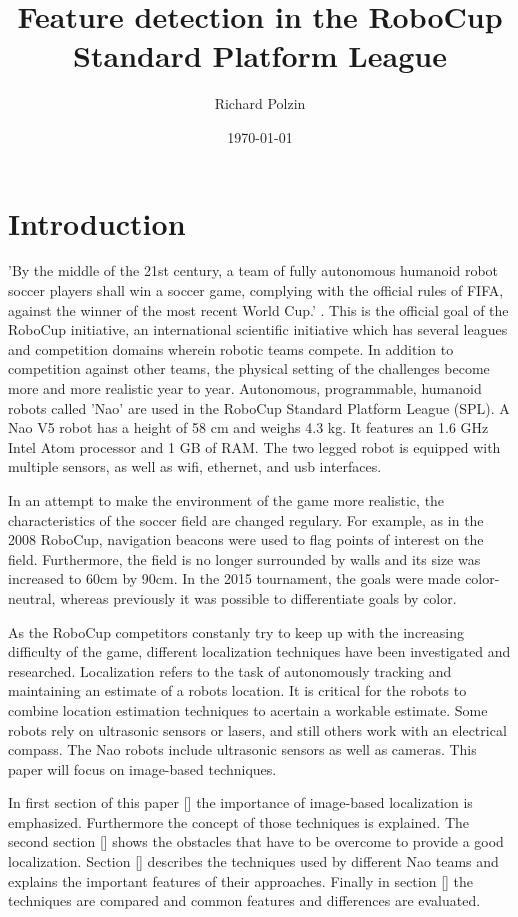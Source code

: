 \documentclass[12pt, a4paper]{apa6}
\author{Richard Polzin}
\title{Feature detection in the RoboCup Standard Platform League}
\date{\today}
\affiliation{}
\begin{document}
  \maketitle

  \section{Introduction}
  'By the middle of the 21st century, a team of fully autonomous humanoid robot soccer players shall win a soccer game, complying with the official rules of FIFA, against the winner of the most recent World Cup.' \cite{Kitano95robocup:the}. This is the official goal of the RoboCup initiative, an international scientific initiative which has several leagues and competition domains wherein robotic teams compete. In addition to competition against other teams, the physical setting of the challenges become more and more realistic year to year. Autonomous, programmable, humanoid robots called 'Nao' are used in the RoboCup Standard Platform League (SPL). A Nao V5 robot has a height of 58 cm and weighs 4.3 kg. It features an 1.6 GHz Intel Atom processor and 1 GB of RAM. The two legged robot is equipped with multiple sensors, as well as wifi, ethernet, and usb interfaces.

  In an attempt to make the environment of the game more realistic, the characteristics of the soccer field are changed regulary. For example, as in the 2008 RoboCup, navigation beacons were used to flag points of interest on the field. Furthermore, the field is no longer surrounded by walls and its size was increased to 60cm by 90cm. In the 2015 tournament, the goals were made color-neutral, whereas previously it was possible to differentiate goals by color.

  As the RoboCup competitors constanly try to keep up with the increasing difficulty of the game, different localization techniques have been investigated and researched. Localization refers to the task of autonomously tracking and maintaining an estimate of a robots location. It is critical for the robots to combine location estimation techniques to acertain a workable estimate. Some robots rely on ultrasonic sensors or lasers, and still others work with an electrical compass. The Nao robots include ultrasonic sensors as well as cameras. This paper will focus on image-based techniques.

  In first section of this paper [] the importance of image-based localization is emphasized. Furthermore the concept of those techniques is explained. The second section [] shows the obstacles that have to be overcome to provide a good localization. Section [] describes the techniques used by different Nao teams and explains the important features of their approaches. Finally in section [] the techniques are compared and common features and differences are evaluated.
\end{document}
